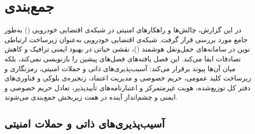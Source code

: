 
\section{جمع‌بندی}

در این گزارش، چالش‌ها و راهکارهای امنیتی در شبکه‌ی اقتضایی خودرویی () به‌طور جامع مورد بررسی قرار گرفت. شبکه‌ی اقتضایی خودرویی به‌عنوان زیرساخت ارتباطی نوین در سامانه‌های حمل‌ونقل هوشمند ()، نقشی حیاتی در بهبود ایمنی ترافیک و کاهش تصادفات ایفا می‌کند. این فصل یافته‌های فصل‌های پیشین را بازنویسی نمی‌کند، بلکه میان آن‌ها پیوند برقرار می‌کند: آسیب‌پذیری‌های ذاتی و حملات امنیتی، رمزنگاری و زیرساخت کلید عمومی، حریم خصوصی و مدیریت اعتماد، زنجیره‌ی بلوکی و فناوری‌های دفتر کل توزیع‌شده، هویت غیرمتمرکز و اعتبارنامه‌های تأییدپذیر، تعادل حریم خصوصی و ایمنی و چشم‌انداز آینده در هفت زیربخش جمع‌بندی می‌شوند.

\subsection{آسیب‌پذیری‌های ذاتی و حملات امنیتی}

